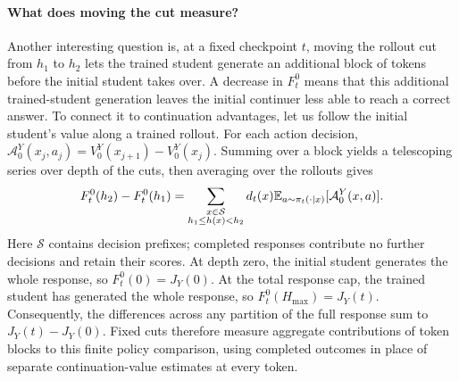 \paragraph{What does moving the cut measure?}
Another interesting question is, at a fixed checkpoint $t$, moving the rollout cut from $h_1$ to $h_2$ lets the trained student generate an additional block of tokens before the initial student takes over. A decrease in $F_t^0$ means that this additional trained-student generation leaves the initial continuer less able to reach a correct answer. To connect it to continuation advantages, let us follow the initial student's value along a trained rollout. For each action decision, $\mathcal A_0^Y(x_j,a_j)=V_0^Y(x_{j+1})-V_0^Y(x_j)$. Summing over a block yields a telescoping series over depth of the cuts, then averaging over the rollouts gives
\begin{equation}
 F_t^0(h_2)-F_t^0(h_1)=\sum_{\substack{x\in\mathcal S\\h_1\le h(x)<h_2}}d_t(x)\mathbb{E}_{a\sim\pi_t(\cdot\mid x)}[\mathcal A_0^Y(x,a)].
 \label{eq:continuation-block-identity}
\end{equation}
Here $\mathcal S$ contains decision prefixes; completed responses contribute no further decisions and retain their scores. At depth zero, the initial student generates the whole response, so $F_t^0(0)=J_Y(0)$. At the total response cap, the trained student has generated the whole response, so $F_t^0(H_{\max})=J_Y(t)$. Consequently, the differences across any partition of the full response sum to $J_Y(t)-J_Y(0)$. Fixed cuts therefore measure aggregate contributions of token blocks to this finite policy comparison, using completed outcomes in place of separate continuation-value estimates at every token.
